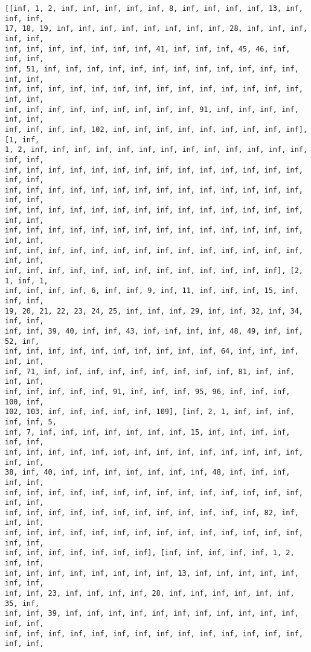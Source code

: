 \documentclass[11pt]{article}
\begin{document}
    \begin{Verbatim}[commandchars=\\\{\}]
[[inf, 1, 2, inf, inf, inf, inf, inf, 8, inf, inf, inf, inf, 13, inf, inf, inf,
17, 18, 19, inf, inf, inf, inf, inf, inf, inf, inf, 28, inf, inf, inf, inf, inf,
inf, inf, inf, inf, inf, inf, inf, 41, inf, inf, inf, 45, 46, inf, inf, inf,
inf, 51, inf, inf, inf, inf, inf, inf, inf, inf, inf, inf, inf, inf, inf, inf,
inf, inf, inf, inf, inf, inf, inf, inf, inf, inf, inf, inf, inf, inf, inf, inf,
inf, inf, inf, inf, inf, inf, inf, inf, inf, 91, inf, inf, inf, inf, inf, inf,
inf, inf, inf, inf, 102, inf, inf, inf, inf, inf, inf, inf, inf, inf], [1, inf,
1, 2, inf, inf, inf, inf, inf, inf, inf, inf, inf, inf, inf, inf, inf, inf, inf,
inf, inf, inf, inf, inf, inf, inf, inf, inf, inf, inf, inf, inf, inf, inf, inf,
inf, inf, inf, inf, inf, inf, inf, inf, inf, inf, inf, inf, inf, inf, inf, inf,
inf, inf, inf, inf, inf, inf, inf, inf, inf, inf, inf, inf, inf, inf, inf, inf,
inf, inf, inf, inf, inf, inf, inf, inf, inf, inf, inf, inf, inf, inf, inf, inf,
inf, inf, inf, inf, inf, inf, inf, inf, inf, inf, inf, inf, inf, inf, inf, inf,
inf, inf, inf, inf, inf, inf, inf, inf, inf, inf, inf, inf, inf], [2, 1, inf, 1,
inf, inf, inf, inf, 6, inf, inf, 9, inf, 11, inf, inf, inf, 15, inf, inf, inf,
19, 20, 21, 22, 23, 24, 25, inf, inf, inf, 29, inf, inf, 32, inf, 34, inf, inf,
inf, inf, 39, 40, inf, inf, 43, inf, inf, inf, inf, 48, 49, inf, inf, 52, inf,
inf, inf, inf, inf, inf, inf, inf, inf, inf, inf, 64, inf, inf, inf, inf, inf,
inf, 71, inf, inf, inf, inf, inf, inf, inf, inf, inf, 81, inf, inf, inf, inf,
inf, inf, inf, inf, inf, 91, inf, inf, inf, 95, 96, inf, inf, inf, 100, inf,
102, 103, inf, inf, inf, inf, inf, 109], [inf, 2, 1, inf, inf, inf, inf, inf, 5,
inf, 7, inf, inf, inf, inf, inf, inf, inf, 15, inf, inf, inf, inf, inf, inf,
inf, inf, inf, inf, inf, inf, inf, inf, inf, inf, inf, inf, inf, inf, inf, inf,
38, inf, 40, inf, inf, inf, inf, inf, inf, inf, 48, inf, inf, inf, inf, inf,
inf, inf, inf, inf, inf, inf, inf, inf, inf, inf, inf, inf, inf, inf, inf, inf,
inf, inf, inf, inf, inf, inf, inf, inf, inf, inf, inf, inf, 82, inf, inf, inf,
inf, inf, inf, inf, inf, inf, inf, inf, inf, inf, inf, inf, inf, inf, inf, inf,
inf, inf, inf, inf, inf, inf, inf], [inf, inf, inf, inf, inf, 1, 2, inf, inf,
inf, inf, inf, inf, inf, inf, inf, inf, 13, inf, inf, inf, inf, inf, inf, inf,
inf, inf, 23, inf, inf, inf, inf, 28, inf, inf, inf, inf, inf, inf, 35, inf,
inf, inf, 39, inf, inf, inf, inf, inf, inf, inf, inf, inf, inf, inf, inf, inf,
inf, inf, inf, inf, inf, inf, inf, inf, inf, inf, inf, inf, inf, inf, inf, inf,

\end{Verbatim}
\end{document}
